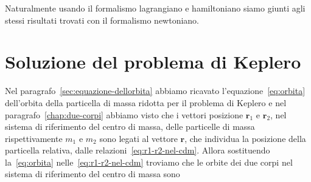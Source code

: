 {Naturalmente usando il formalismo lagrangiano e hamiltoniano siamo giunti agli
stessi risultati trovati con il formalismo newtoniano.

\section{Soluzione del problema di Keplero}
\label{sec:soluzione-problema}

Nel paragrafo~\ref{sec:equazione-dellorbita} abbiamo ricavato
l'equazione~\eqref{eq:orbita} dell'orbita della particella di massa ridotta per
il problema di Keplero e nel paragrafo~\ref{chap:due-corpi} abbiamo visto che
i vettori posizione $\bm{r}_1$ e $\bm{r}_2$, nel sistema di riferimento del
centro di massa, delle particelle di massa rispettivamente $m_1$ e $m_2$ sono
legati al vettore $\bm{r}$, che individua la posizione della particella
relativa, dalle relazioni~\eqref{eq:r1-r2-nel-cdm}. Allora sostituendo
la~\eqref{eq:orbita} nelle~\eqref{eq:r1-r2-nel-cdm} troviamo che le orbite dei
due corpi nel sistema di riferimento del centro di massa sono
\begin{figure}
  \centering
  \pgfmathsetmacro{\c}{\a*\e} %
  \pgfmathsetmacro{\mridotta}{\muno*\mdue/(\muno+\mdue)} %


\end{figure}}
